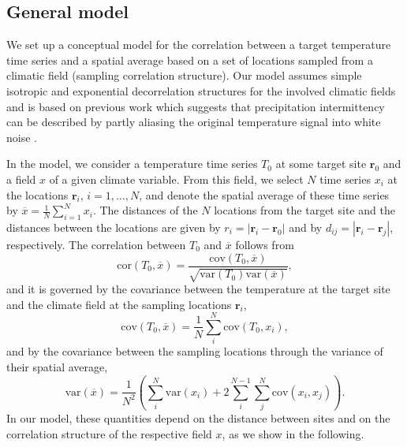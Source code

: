 \documentclass[cp, manuscript]{copernicus}
\begin{document}
\subsection{General model}
\label{app:concept.model.general}

We set up a conceptual model for the correlation between a target temperature
time series and a spatial average based on a set of locations sampled from a
climatic field (sampling correlation structure). Our model assumes simple
isotropic and exponential decorrelation structures for the involved climatic
fields and is based on previous work which suggests that precipitation
intermittency can be described by partly aliasing the original temperature
signal into white noise \citep{Laepple2018}.

In the model, we consider a temperature time series $T_0$ at some target site
$\mathbf{r}_0$ and a field $x$ of a given climate variable. From this field, we
select $N$ time series $x_i$ at the locations $\mathbf{r}_i$, $i=1,\dotsc,N$,
and denote the spatial average of these time series by
$\overline{x}=\frac{1}{N}\sum_{i=1}^{N}{x_i}$. The distances of the $N$
locations from the target site and the distances between the locations are given
by $r_i=|\mathbf{r}_i-\mathbf{r}_0|$ and by
$d_{ij}=|{\mathbf{r}_i-\mathbf{r}_j}|$, respectively. The correlation between
$T_0$ and $\overline{x}$ follows from
%
\begin{equation}
\label{eq:corr.general}
\mathrm{cor}(T_0,\overline{x})=\frac
{\mathrm{cov}(T_0,\overline{x})}
{\sqrt{\mathrm{var}(T_0)\mathrm{var}(\overline{x})}},
\end{equation}
and it is governed by the covariance between the temperature at the target site
and the climate field at the sampling locations $\mathbf{r}_i$,
%
\begin{equation}
\label{eq:cov.general}
\mathrm{cov}(T_0,\overline{x})=
\frac{1}{N}\sum_{i}^{N}{\mathrm{cov}(T_0,x_i)},
\end{equation}
%
and by the covariance between the sampling locations through the variance of
their spatial average,
\begin{equation}
\label{eq:var.general}
\mathrm{var}(\overline{x})=
\frac{1}{N^2}\left(
\sum_{i}^{N}{\mathrm{var}(x_i)} +
2\sum_{i}^{N-1}\sum_{j}^{N}{\mathrm{cov}(x_i,x_j)}
\right).
\end{equation}
%
In our model, these quantities depend on the distance between sites and on the
correlation structure of the respective field $x$, as we show in the following.
\end{document}
